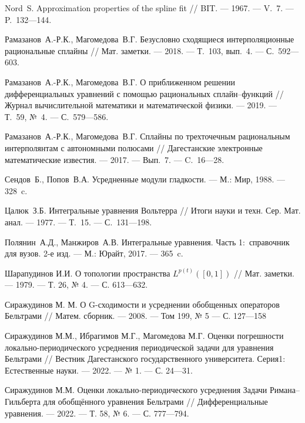 \begin{thebibliography}{99}
Nord~S.
Approximation properties of the spline fit
//
BIT.
--- 1967.
--- V.~7.
--- P.~132---144.




Рамазанов~А.-Р.К., Магомедова~В.Г.
Безусловно сходящиеся
интерполяционные рациональные сплайны
//
Мат. заметки.
--- 2018.
--- Т.~103, вып.~4.
--- С.~592---603.




Рамазанов~А.-Р.К., Магомедова~В.Г.
О приближенном решении дифференциальных уравнений с помощью рациональных сплайн--функций
//
Журнал вычислительной математики и математической физики.
--- 2019.
--- Т.~59, №~4.
--- С.~579---586.




Рамазанов~А.-Р.К., Магомедова~В.Г.
Сплайны по трехточечным рациональным интерполянтам с автономными полюсами
//
Дагестанские электронные математические известия.
--- 2017.
--- Вып.~7.
--- C.~16---28.




Сендов~Б., Попов~В.А.
Усредненные модули гладкости.
--- М.: Мир, 1988.
--- 328~c.




Цалюк~З.Б.
Интегральные уравнения Вольтерра
//
Итоги науки и техн. Сер. Мат. анал.
--- 1977.
--- Т.~15.
--- С.~131---198.




Полянин~А.Д., Манжиров~А.В.
Интегральные уравнения. Часть 1:~справочник для вузов. 2-е изд.
--- М.: Юрайт, 2017.
--- 365~c.




Шарапудинов И.И.
О топологии пространства $L^{p(t)}([0,1])$
//
Мат. заметки.
--- 1979.
--- Т. 26, № 4.
--- С. 613---632.



Сиражудинов М. М. О G-сходимости и усреднении обобщенных операторов Бельтрами // Матем. сборник. --- 2008. --- Том 199, № 5 --- С. 127---158

  


	Сиражудинов М.М., Ибрагимов М.Г., Магомедова М.Г. Оценки погрешности локально-периодического усреднения периодической задачи для уравнения Бельтрами // Вестник Дагестанского государственного университета. Серия1: Естественные науки. --- 2022. --- № 1. --- С. 24---31.

  


	Сиражудинов М.М. Оценки локально-периодического усреднения Задачи Римана–Гильберта для обобщённого уравнения Бельтрами // Дифференциальные уравнения. --- 2022. --- Т. 58, № 6. --- С. 777---794.


\end{thebibliography}
